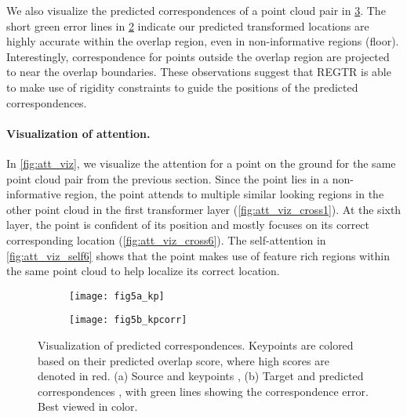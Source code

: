 \documentclass[10pt,twocolumn,letterpaper]{article}
\begin{document}
We also visualize the predicted correspondences of a point cloud pair in \cref{fig:viz-corr}. The short green error lines in \cref{fig:viz-corr-b} indicate our predicted transformed locations are highly accurate within the overlap region, even in non-informative regions (\eg floor).
Interestingly, correspondence for points outside the overlap region are projected to near the overlap boundaries. These observations suggest that REGTR is able to make use of rigidity constraints to guide the positions of the predicted correspondences.

\vspace{-4mm}
\paragraph{Visualization of attention.}
In \cref{fig:att_viz}, we visualize the attention for a point on the ground for the same point cloud pair from the previous section. Since the point lies in a non-informative region, the point attends to multiple similar looking regions in the other point cloud in the first transformer layer (\cref{fig:att_viz_cross1}). At the sixth layer, the point is confident of its position and mostly focuses on its correct corresponding location (\cref{fig:att_viz_cross6}). The self-attention in \cref{fig:att_viz_self6} shows that the point makes use of feature rich regions within the same point cloud to help localize its correct location.

\begin{figure}[t]
    \begin{subfigure}[b]{0.421\linewidth}
        \centering
        \texttt{[image: fig5a\_kp]}
        \vspace{-1mm}
        \caption{}
        \label{fig:viz-corr-a}
    \end{subfigure}
    \hfill
    \begin{subfigure}[b]{0.559\linewidth}
        \centering
        \texttt{[image: fig5b\_kpcorr]}
        \vspace{-1mm}
        \caption{}
        \label{fig:viz-corr-b}
    \end{subfigure}
    \vspace{-2mm}
    \caption{Visualization of predicted correspondences. Keypoints are colored based on their predicted overlap score, where high scores are denoted in red. (a) Source  and keypoints , (b) Target  and predicted correspondences , with green lines showing the correspondence error. Best viewed in color.}
    \label{fig:viz-corr}
\end{figure}
\end{document}
